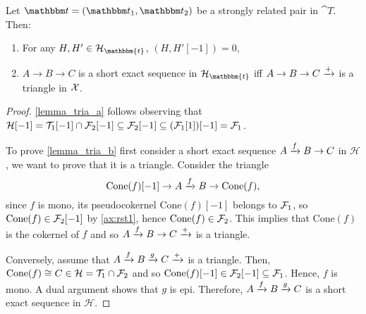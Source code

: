 \begin{lemma}\label{lemma_tria}
  Let $\t=(\t_1,\t_2)$ be a strongly related pair in $\cat{T}$. Then:
  \begin{enumerate}
    \item\label{lemma_tria_a} For any $H,H'\in\clH_\mathbbm{t}$, $(H,H'[-1])=0$,
    \item\label{lemma_tria_b} $A\to B\to C$ is a short exact sequence in $\mathcal{H}_\mathbbm{t}$ iff $A\to B\to C\xrightarrow{+}$ is
    a triangle in $\mathcal{X}$.
  \end{enumerate}
\end{lemma}

\begin{proof}
  \ref{lemma_tria_a} follows observing that
  $\mathcal{H}[-1]=\mathcal{T}_1[-1]\cap\mathcal{F}_2[-1]\subseteq \mathcal{F}_2[-1]\subseteq(\mathcal{F}_1[1])[-1]=\mathcal{F}_1$.

  To prove \ref{lemma_tria_b} first consider a short exact sequence $A\xrightarrow{f} B\to C$ in $\mathcal{H}$, we want to
  prove that it is a triangle. Consider the triangle
  \begin{equation*}
    \mathrm{Cone}(f)[-1]\to A\xrightarrow{f} B \to \mathrm{Cone}(f),
  \end{equation*}
  since $f$ is mono, its pseudocokernel $\mathrm{Cone}(f)[-1]$ belongs to $\mathcal{F}_1$, so
  $\mathrm{Cone}(f)\in\mathcal{F}_2[-1]$ by \ref{ax:rst1}, hence $\mathrm{Cone}(f)\in\mathcal{F}_2$.
  This implies that $\mathrm{Cone}(f)$ is the cokernel of $f$ and so $A\xrightarrow{f} B\to C\xrightarrow{+}$ is a triangle.

  Conversely, assume that $A\xrightarrow{f} B\xrightarrow{g} C\xrightarrow{+}$ is a triangle. Then, $\mathrm{Cone}(f)\cong C\in\mathcal{H}=\mathcal{T}_1\cap\mathcal{F}_2$ and
  so $\mathrm{Cone}(f)[-1]\in\mathcal{F}_2[-1]\subseteq \mathcal{F}_1$. Hence, $f$ is mono. A dual argument
  shows that $g$ is epi. Therefore, $A\xrightarrow{f} B\xrightarrow{g} C$ is a short exact sequence in $\mathcal{H}$.
\end{proof}

